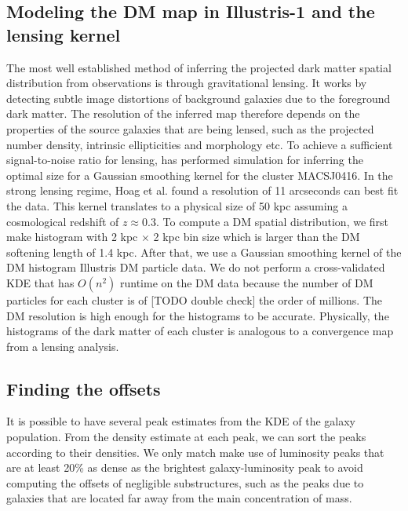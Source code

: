 \subsection{Modeling the DM map in Illustris-1 and the lensing kernel}
The most well established method of inferring the projected dark matter spatial 
distribution from observations is through gravitational lensing.
It works by detecting subtle image distortions of background galaxies due to
the foreground dark matter. The resolution of the inferred map therefore 
depends on the properties of the source galaxies that are being lensed, 
such as the projected number density, 
intrinsic ellipticities and morphology etc.
To achieve a sufficient signal-to-noise ratio for lensing, 
\citealt{Hoag2016}  has performed simulation for inferring the optimal size
for a Gaussian smoothing kernel for the cluster MACSJ0416. 
In the strong lensing regime, Hoag et al. found a resolution of 11 arcseconds
can best fit the data. This kernel translates to a physical size of 50 
kpc assuming a cosmological redshift of $z \approx 0.3$.
To compute a DM spatial distribution, we first make histogram with 2 kpc
$\times$ 2 kpc bin size which is larger than the DM softening length of 1.4 kpc. 
After that, we use a Gaussian smoothing kernel of the DM histogram Illustris DM
particle data. We do not perform a cross-validated KDE that has
$O(n^2)$ runtime on the DM data because the
number of DM particles for each cluster is of 
[TODO double check] the order of millions. The DM
resolution is high enough for the histograms to be accurate.  
Physically, the histograms of the dark matter of each cluster 
is analogous to a convergence map from a lensing analysis. 

\subsection{Finding the offsets} \label{subsec:offsets}
It is possible to have several peak estimates from the KDE of the galaxy 
population. 
From the density estimate at each peak, we can sort 
the peaks according to their densities. We only match make use of luminosity 
peaks that are at 
least 20\% as dense as the brightest galaxy-luminosity peak to avoid 
computing the offsets of negligible substructures, such as the peaks due to 
galaxies that are located far away from the main concentration of mass.

